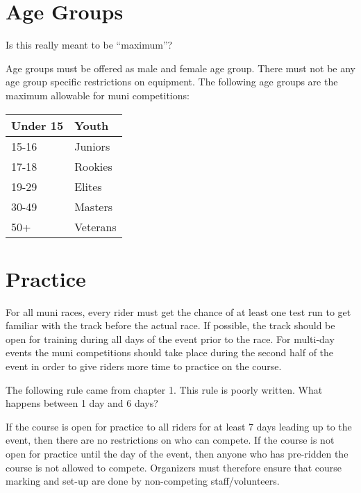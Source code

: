 \section{Age Groups}

\begin{comment-2016}%
Is this really meant to be ``maximum''?
\end{comment-2016}

Age groups must be offered as male and female age group.
There must not be any age group specific restrictions on equipment.
The following age groups are the maximum allowable for muni competitions:

\begin{tabular}{|l|l|}
\hline
Under 15 & Youth \\
\hline
15-16 & Juniors \\
\hline
17-18 & Rookies \\
\hline
19-29 & Elites \\
\hline
30-49 & Masters \\
\hline
50+ & Veterans \\
\hline
\end{tabular}

\section{Practice}

For all muni races, every rider must get the chance of at least one test run to get familiar with the track before the actual race.
If possible, the track should be open for training during all days of the event prior to the race.
For multi-day events the muni competitions should take place during the second half of the event in order to give riders more time to practice on the course.

\begin{comment-2016}
The following rule came from chapter 1. This rule is poorly written.  What happens between 1 day and 6 days?
\end{comment-2016}

If the course is open for practice to all riders for at least 7 days leading up to the event, then there are no restrictions on who can compete. 
If the course is not open for practice until the day of the event, then anyone who has pre-ridden the course is not allowed to compete. 
Organizers must therefore ensure that course marking and set-up are done by non-competing staff/volunteers.

